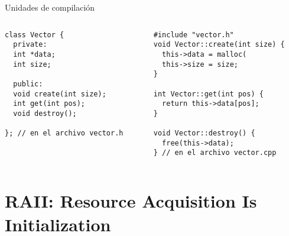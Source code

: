 \begin{frame}{Unidades de compilaci\'on}{}
   \begin{columns}[t]
      \begin{column}{.4\linewidth}
        \begin{lstlisting}[style=normal,firstnumber=1]
class Vector {
  private:
  int *data;
  int size;

  public:
  void create(int size);
  int get(int pos);
  void destroy();

}; // en el archivo vector.h
        \end{lstlisting}
     \end{column}
     \begin{column}{.4\linewidth}
        \begin{lstlisting}[style=normal,firstnumber=1]
#include "vector.h"
void Vector::create(int size) {
  this->data = malloc(
  this->size = size;
}

int Vector::get(int pos) {
  return this->data[pos];
}

void Vector::destroy() {
  free(this->data);
} // en el archivo vector.cpp
        \end{lstlisting}
    \end{column}
\end{columns}
\end{frame}

\section{RAII: Resource Acquisition Is Initialization}
